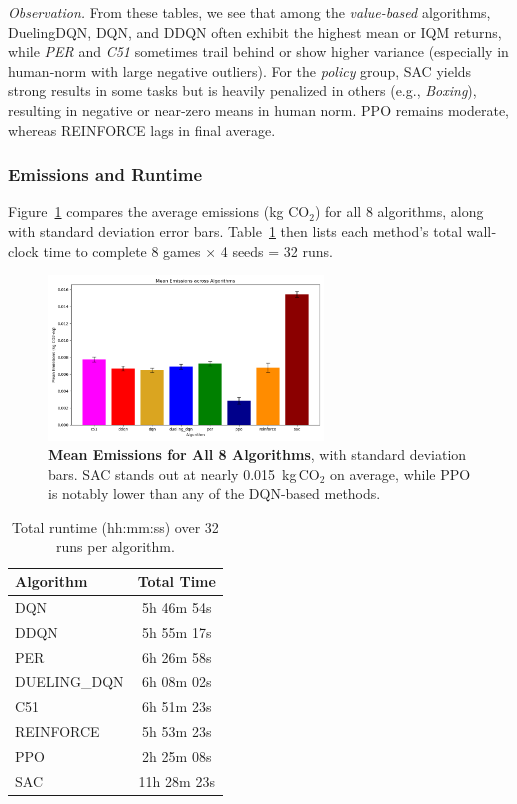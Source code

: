 \noindent
\emph{Observation.} From these tables, we see that among the \emph{value-based} algorithms, 
DuelingDQN, DQN, and DDQN often exhibit the highest mean or IQM returns, while 
\emph{PER} and \emph{C51} sometimes trail behind or show higher variance (especially in 
human‐norm with large negative outliers). For the \emph{policy} group, SAC yields strong 
results in some tasks but is heavily penalized in others (e.g., \emph{Boxing}), resulting 
in negative or near‐zero means in human norm. PPO remains moderate, whereas REINFORCE 
lags in final average.

\subsubsection{Emissions and Runtime}

Figure~\ref{fig:barplot_emissions_total} compares the average emissions (kg CO$_2$) for 
all 8 algorithms, along with standard deviation error bars. Table~\ref{tab:total_runtimes} 
then lists each method’s total wall‐clock time to complete 8 games × 4 seeds = 32 runs.

\begin{figure} 
	\centering
	\includegraphics[width=0.65\textwidth]{figures/comparison/barplot_emissions_total.png}
	\caption{\textbf{Mean Emissions for All 8 Algorithms}, with standard deviation bars.
		SAC stands out at nearly 0.015~kg\,CO$_2$ on average, while PPO is notably lower than
		any of the DQN-based methods.}
	\label{fig:barplot_emissions_total}
\end{figure}

\begin{table} 
	\centering
	\caption{Total runtime (hh:mm:ss) over 32 runs per algorithm.}
	\label{tab:total_runtimes}
	\begin{tabular}{lc}
		\toprule
		\textbf{Algorithm} & \textbf{Total Time} \\
		\midrule
		DQN          & 5h 46m 54s \\
		DDQN         & 5h 55m 17s \\
		PER          & 6h 26m 58s \\
		DUELING\_DQN & 6h 08m 02s \\
		C51          & 6h 51m 23s \\
		REINFORCE    & 5h 53m 23s \\
		PPO          & 2h 25m 08s \\
		SAC          & 11h 28m 23s \\
		\bottomrule
	\end{tabular}
\end{table}

